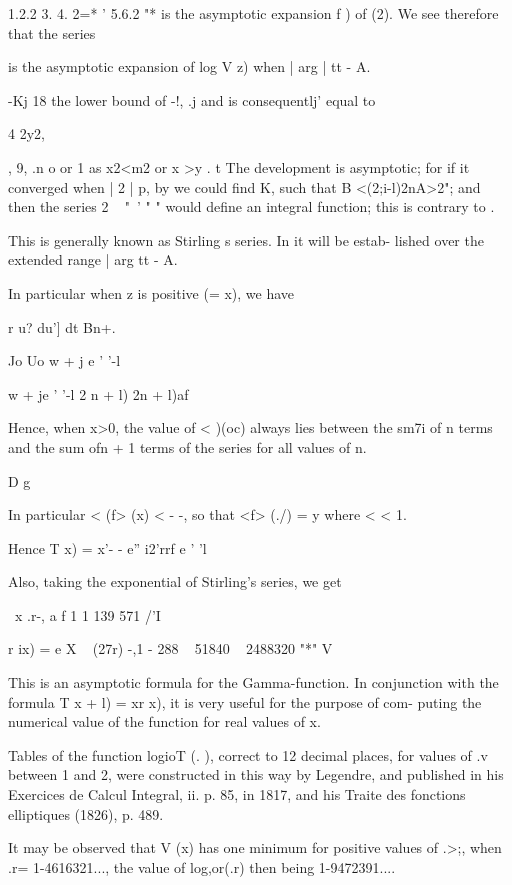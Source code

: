 1.2.2 3. 4. 2=* ' 5.6.2 "* is the asymptotic expansion f ) of
(2). We see therefore that the series

is the asymptotic expansion of log V z) when | arg | tt - A.

-Kj 18 the lower bound of -!, .j and is consequentlj' equal to

4 2y2,

, 9, .n o or 1 as x2<m2 or x >y . t The development is asymptotic;
for if it converged when | 2 | p, by  we could find K, such that
B <(2;i-l)2nA>2"; and then the series 2 ~ "~' " " would define an
integral function; this is contrary to .

%
%

This is generally known as Stirling s series. In  it will be
estab- lished over the extended range | arg tt - A.

In particular when z is positive (= x), we have

r u? du'] dt Bn+.

Jo Uo w + j e ' '-l

w + je ' '-l 2 n + l) 2n + l)af

Hence, when x>0, the value of < )(oc) always lies between the sm7i of
n terms and the sum ofn + 1 terms of the series for all values of n.

D g

In particular < (f> (x) < - -, so that <f> (./) = y where < < 1.

Hence T x) = x'- - e'' i2'rrf e ' 'l

Also, taking the exponential of Stirling's series, we get

\ x .r-, a f 1 1 139 571 /'I

r ix) = e X ~ (27r) -,1 - 288 ~ 51840 ~ 2488320 "*" V

This is an asymptotic formula for the Gamma-function. In conjunction
with the formula T x + l) = xr x), it is very useful for the purpose
of com- puting the numerical value of the function for real values of
x.

Tables of the function logioT (. ), correct to 12 decimal places, for
values of .v between 1 and 2, were constructed in this way by
Legendre, and published in his Exercices de Calcul Integral, ii. p.
85, in 1817, and his Traite des fonctions elliptiques (1826), p. 489.

It may be observed that V (x) has one minimum for positive values of
.>;, when .r= 1-4616321..., the value of log,or(.r) then being
1-9472391....

